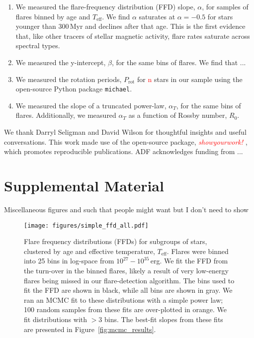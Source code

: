 \documentclass[twocolumn]{aastex631}
\begin{document}
\begin{enumerate}
  \item We measured the flare-frequency distribution (FFD) slope, $\alpha$, for samples
  of flares binned by age and $T_\textrm{eff}$. We find $\alpha$ saturates at
  $\alpha = -0.5$ for stars younger than 300\,Myr and declines after that age.
  This is the first evidence that, like other tracers of stellar magnetic activity,
  flare rates saturate across spectral types.
  \item We measured the y-intercept, $\beta$, for the same bins of flares. We find
  that ...
  \item We measured the rotation periods, $P_\textrm{rot}$ for \textcolor{red}{n}
  stars in our sample using the open-source Python package \texttt{michael}.
  \item We measured the slope of a truncated power-law, $\alpha_T$, for the same
  bins of flares. Additionally, we measured $\alpha_T$ as a function of Rossby
  number, $R_0$.
\end{enumerate}

\vspace{3mm}

We thank Darryl Seligman and David Wilson for thoughtful insights and useful
conversations. This work made use of the open-source package,
\textcolor{red}{\textit{showyourwork!}} \citep{luger2021}, which promotes
reproducible publications. ADF acknowledges funding from ...

\appendix
\restartappendixnumbering

\section{Supplemental Material}\label{appendix:supp_ffds}

Miscellaneous figures and such that people might want but I don't need to show

\begin{figure*}[ht!]
    \begin{centering}
        \texttt{[image: figures/simple\_ffd\_all.pdf]}
        \caption{
            Flare frequency distributions (FFDs) for subgroups of stars, clustered
            by age and effective temperature, $T_\textrm{eff}$. Flares were binned
            into 25 bins in log-space from $10^{27} - 10^{35}$\,erg. We fit the FFD
            from the turn-over in the binned flares, likely a result of very low-energy
            flares being missed in our flare-detection algorithm. The bins used to fit
            the FFD are shown in black, while all bins are shown in gray. We ran an MCMC
            fit to these distributions with a simple power law; 100 random samples from these
            fits are over-plotted in orange. We fit distributions with $> 3$ bins.
            The best-fit slopes from these fits are presented in Figure~\ref{fig:mcmc_results}.
        }
        \label{fig:simple_ffd_all}
    \end{centering}
\end{figure*}



\end{document}
